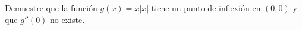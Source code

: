 \item Demuestre que la función $g(x) = x|x|$ tiene un punto de inflexión en $(0, 0)$ y que $g''(0)$ no existe.
